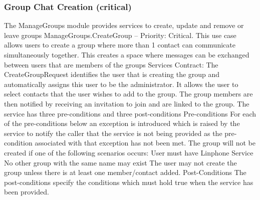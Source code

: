 \documentclass[11pt]{article}
\begin{document}
\subsubsection{Group Chat Creation (critical)}
The ManageGroups module provides services to create, update and remove or leave groups\newline
\newline
\bullet ManageGroups.CreateGroup – Priority: Critical.\newline
\bullet	This use case allows users to create a group where more than 1 contact can communicate simultaneously together.\newline
\bullet	This creates a space where messages can be exchanged between users that are members of the groups \newline
\newline
	Services Contract: \newline
	\newline
\bullet The CreateGroupRequest identifies the user that is creating the group and automatically assigns this user to be the administrator.\newline
\bullet It allows the user to select contacts that the user wishes to add to the group.\newline
\bullet The group members are then notified by receiving an invitation to join and are linked to the group.\newline
\bullet The service has three pre-conditions and three post-conditions\newline
\newline Pre-conditions\newline
For each of the pre-conditions below an exception is introduced which is raised by the service to notify the caller that the service is not being provided as the pre-condition associated with that exception has not been met.\newline
The group will not be created if one of the following scenarios occurs:\newline
\newline
\bullet	User must have Linphone Service\newline
\bullet	No other group with the same name may exist \newline
\bullet	The user may not create the group unless there is at least one member/contact added.\newline
\newline
Post-Conditions\newline
The post-conditions specify the conditions which must hold true when the service has been provided.\newline
\end{document}

